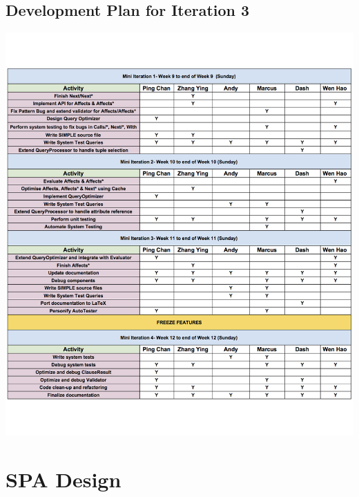 \documentclass[12pt]{article}
\begin{document}
\subsection{Development Plan for Iteration 3}
\includegraphics[width = 1.1\textwidth,center]{Iteration3.jpg}
\newpage
\section{SPA Design}
\end{document}
